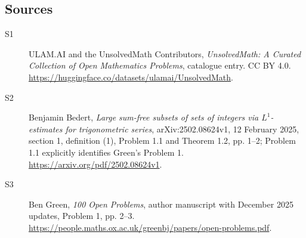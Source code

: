 \documentclass[11pt]{article}
\begin{document}
\subsection{Sources}
\begin{description}
\item[\hypertarget{source:statement:1}{S1}] ULAM.AI and the UnsolvedMath Contributors, \emph{UnsolvedMath: A Curated Collection of Open Mathematics Problems}, catalogue entry. CC BY 4.0. \url{https://huggingface.co/datasets/ulamai/UnsolvedMath}.
\item[\hypertarget{source:statement:2}{S2}] Benjamin Bedert, \emph{Large sum-free subsets of sets of integers via $L^1$-estimates for trigonometric series}, arXiv:2502.08624v1, 12 February 2025, section 1, definition (1), Problem 1.1 and Theorem 1.2, pp. 1--2; Problem 1.1 explicitly identifies Green's Problem 1. \url{https://arxiv.org/pdf/2502.08624v1}.
\item[\hypertarget{source:statement:3}{S3}] Ben Green, \emph{100 Open Problems}, author manuscript with December 2025 updates, Problem 1, pp. 2--3. \url{https://people.maths.ox.ac.uk/greenbj/papers/open-problems.pdf}.
\end{description}
\label{end:statement}
\end{document}
